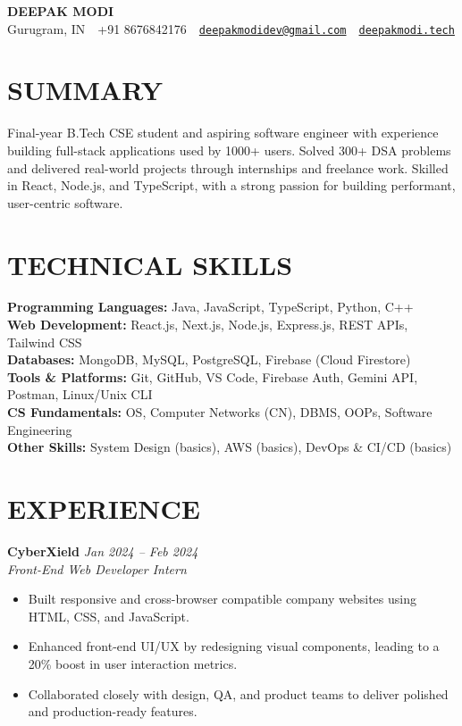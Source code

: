 \documentclass[a4paper,11pt]{article}
\begin{document}
\small
\begin{center}
    {\huge \textbf{DEEPAK MODI}} \\
    \vspace{6pt}
    Gurugram, IN~\textbar~+91 8676842176~\textbar~\href{mailto:deepakmodidev@gmail.com}{\nolinkurl{deepakmodidev@gmail.com}}~\textbar~\href{https://deepakmodi.tech}{\texttt{deepakmodi.tech}}
\end{center}

\section*{SUMMARY}
Final-year B.Tech CSE student and aspiring software engineer with experience building full-stack applications used by 1000+ users. Solved 300+ DSA problems and delivered real-world projects through internships and freelance work. Skilled in React, Node.js, and TypeScript, with a strong passion for building performant, user-centric software.

\section*{TECHNICAL SKILLS}
\textbf{Programming Languages:} Java, JavaScript, TypeScript, Python, C++ \\
\textbf{Web Development:} React.js, Next.js, Node.js, Express.js, REST APIs, Tailwind CSS \\
\textbf{Databases:} MongoDB, MySQL, PostgreSQL, Firebase (Cloud Firestore) \\
\textbf{Tools \& Platforms:} Git, GitHub, VS Code, Firebase Auth, Gemini API, Postman, Linux/Unix CLI \\
\textbf{CS Fundamentals:} OS, Computer Networks (CN), DBMS, OOPs, Software Engineering \\
\textbf{Other Skills:} System Design (basics), AWS (basics), DevOps & CI/CD (basics)

\section*{EXPERIENCE}
\textbf{CyberXield} \hfill \textit{Jan 2024 -- Feb 2024} \\
\textit{Front-End Web Developer Intern}
\begin{itemize}
    \item Built responsive and cross-browser compatible company websites using HTML, CSS, and JavaScript.
    \item Enhanced front-end UI/UX by redesigning visual components, leading to a 20\% boost in user interaction metrics.
    \item Collaborated closely with design, QA, and product teams to deliver polished and production-ready features.
\end{itemize}
\end{document}
